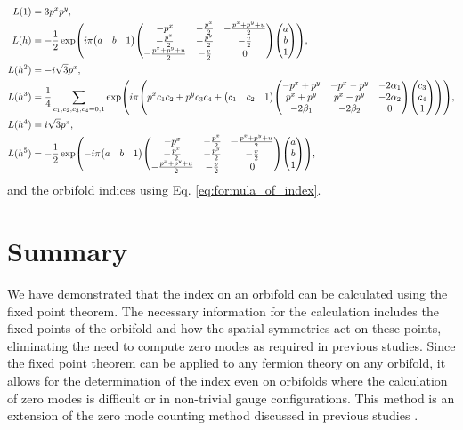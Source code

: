 \documentclass[11pt]{article}
\begin{document}
\begin{align}
    L(1)&=3p^x p^y ,\\ 
    L(h)&=-\frac{1}{2}\exp(i\pi \mqty(a& b&1) \mqty( -p^x & -\frac{p^x}{2} & -\frac{p^x+p^y+u}{2} \\  -\frac{p^x}{2}& -\frac{p^y}{2}   & -\frac{v}{2} \\  -\frac{p^x+p^y+u}{2}  & -\frac{v}{2} &0 ) \mqty(a\\ b\\1)), \\
    L(h^2)&= -i\sqrt{3}p^x,  \\
    L(h^3)&= \frac{1}{4}\sum_{c_1,c_2,c_3,c_4=0,1} \exp( i\pi \qty( p^x c_1 c_2+p^y c_3 c_4 + \mqty(c_1 &c_2 & 1) \mqty( -p^x+ p^y & -p^x-p^y & -2 \alpha_1  \\
    p^x+ p^y & p^x-p^y & -2 \alpha_2   \\
    -2 \beta_1 & -2 \beta_2 & 0) \mqty(c_3 \\ c_4 \\ 1) )), \\
    L(h^4)&=i\sqrt{3}p^x,  \\
    L(h^5)&=-\frac{1}{2}\exp(-i\pi \mqty(a& b&1) \mqty( -p^x & -\frac{p^x}{2} & -\frac{p^x+p^y+u}{2} \\  -\frac{p^x}{2}& -\frac{p^y}{2}   & -\frac{v}{2} \\  -\frac{p^x+p^y+u}{2}  & -\frac{v}{2} &0 ) \mqty(a\\ b\\1)) ,
\end{align}
and the orbifold indices using Eq. \eqref{eq:formula_of_index}.


\section{Summary}
\label{Conclusion}
We have demonstrated that the index on an orbifold can be calculated using the fixed point theorem. The necessary information for the calculation includes the fixed points of the orbifold and how the spatial symmetries act on these points, eliminating the need to compute zero modes as required in previous studies. Since the fixed point theorem can be applied to any fermion theory on any orbifold, it allows for the determination of the index even on orbifolds where the calculation of zero modes is difficult or in non-trivial gauge configurations. This method is an extension of the zero mode counting method discussed in previous studies \cite{Sakamoto:2020pev,Kobayashi:2022tti,Imai:2022bke,Kikuchi:2022lfv,Kikuchi:2022psj}.
\end{document}
